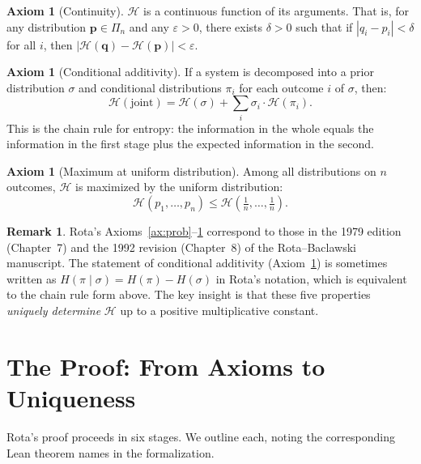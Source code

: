 \documentclass[12pt,a4paper]{article}
\theoremstyle{definition}
\newtheorem{axiom_def}[theorem]{Axiom}
\newtheorem{remark}[theorem]{Remark}
\newcommand{\Hfunc}{\mathcal{H}}
\begin{document}
\begin{axiom_def}[Continuity]
\label{ax:cont}
$\Hfunc$ is a continuous function of its arguments.  That is, for any
distribution $\mathbf{p} \in \Pi_n$ and any $\varepsilon > 0$, there
exists $\delta > 0$ such that if
$|q_i - p_i| < \delta$ for all $i$, then
$|\Hfunc(\mathbf{q}) - \Hfunc(\mathbf{p})| < \varepsilon$.
\end{axiom_def}

\begin{axiom_def}[Conditional additivity]
\label{ax:add}
If a system is decomposed into a prior distribution $\sigma$ and
conditional distributions $\pi_i$ for each outcome $i$ of $\sigma$,
then:
\[
  \Hfunc(\text{joint}) = \Hfunc(\sigma) +
  \sum_{i} \sigma_i \cdot \Hfunc(\pi_i).
\]
This is the chain rule for entropy: the information in the whole equals
the information in the first stage plus the expected information in the
second.
\end{axiom_def}

\begin{axiom_def}[Maximum at uniform distribution]
\label{ax:max}
Among all distributions on $n$ outcomes, $\Hfunc$ is maximized by the
uniform distribution:
\[
  \Hfunc(p_1, \dots, p_n) \leq
  \Hfunc\!\left(\tfrac{1}{n}, \dots, \tfrac{1}{n}\right).
\]
\end{axiom_def}

\begin{remark}
Rota's Axioms~\ref{ax:prob}--\ref{ax:max} correspond to those in the
1979 edition (Chapter~7) and the 1992 revision (Chapter~8) of the
Rota--Baclawski manuscript.  The statement of conditional additivity
(Axiom~\ref{ax:add}) is sometimes written as
$H(\pi \mid \sigma) = H(\pi) - H(\sigma)$ in Rota's notation, which is
equivalent to the chain rule form above.  The key insight is that these
five properties \emph{uniquely determine} $\Hfunc$ up to a positive
multiplicative constant.
\end{remark}

\section{The Proof: From Axioms to Uniqueness}
\label{sec:proof}

Rota's proof proceeds in six stages.  We outline each, noting the
corresponding Lean theorem names in the formalization.
\end{document}
